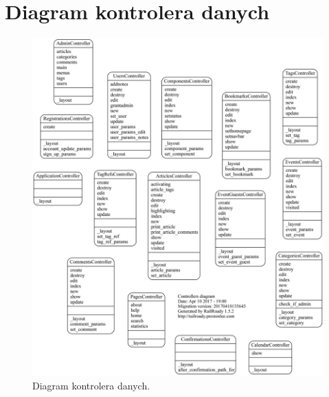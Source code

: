 \documentclass[openright]{xmgr}
\begin{document}
\section{Diagram kontrolera danych}
\begin{figure}[!tbh]
\centering
\includegraphics[width=.9\linewidth]{fig/controllers}
\caption{Diagram kontrolera danych.}
\end{figure}

\newpage
\end{document}
